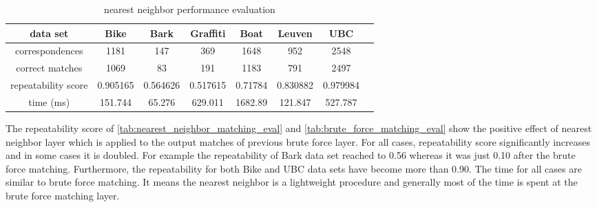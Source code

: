 \begin{table}[H]
  \begin{tabular}{| c || c | c | c | c | c | c | c |}
      \hline
      data set & Bike & Bark & Graffiti & Boat & Leuven & UBC \\ \hline \hline
      correspondences & 1181 & 147 & 369 & 1648 & 952 & 2548 \\ \hline
      correct matches & 1069 & 83 & 191 & 1183 & 791 & 2497 \\ \hline
      repeatability score & 0.905165 & 0.564626 & 0.517615 & 0.71784 & 0.830882 & 0.979984\\ \hline
      time (ms) & 151.744 & 65.276 & 629.011 & 1682.89 & 121.847 & 527.787 \\ \hline
  \end{tabular}
  \caption{nearest neighbor performance evaluation} \label{tab:nearest_neighbor_matching_eval}
\end{table}

The repeatability score of \autoref{tab:nearest_neighbor_matching_eval} and \autoref{tab:brute_force_matching_eval} show the positive effect of nearest neighbor layer which is applied to the output matches of previous brute force layer. For all cases, repeatability score significantly increases and in some cases it is doubled. For example the repeatability of Bark data set reached to 0.56 whereas it was just 0.10 after the brute force matching. Furthermore, the repeatability for both Bike and UBC data sets have become more than 0.90. The time for all cases are similar to brute force matching. It means the nearest neighbor is a lightweight procedure and generally most of the time is spent at the brute force matching layer.

